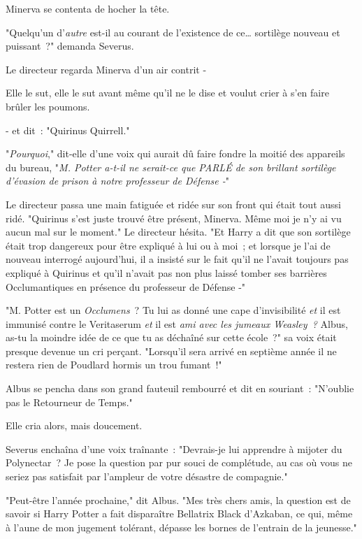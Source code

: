 Minerva se contenta de hocher la tête.

"Quelqu'un d'\emph{autre} est-il au courant de l'existence de ce… sortilège nouveau et puissant~?" demanda Severus.

Le directeur regarda Minerva d'un air contrit -

Elle le sut, elle le sut avant même qu'il ne le dise et voulut crier à s'en faire brûler les poumons.

- et dit~: "Quirinus Quirrell."

"\emph{Pourquoi}," dit-elle d'une voix qui aurait dû faire fondre la moitié des appareils du bureau, "\emph{M. Potter a-t-il ne serait-ce que PARLÉ de son brillant sortilège d'évasion de prison à notre professeur de Défense -}"

Le directeur passa une main fatiguée et ridée sur son front qui était tout aussi ridé. "Quirinus s'est juste trouvé être présent, Minerva. Même moi je n'y ai vu aucun mal sur le moment." Le directeur hésita. "Et Harry a dit que son sortilège était trop dangereux pour être expliqué à lui ou à moi~; et lorsque je l'ai de nouveau interrogé aujourd'hui, il a insisté sur le fait qu'il ne l'avait toujours pas expliqué à Quirinus et qu'il n'avait pas non plus laissé tomber ses barrières Occlumantiques en présence du professeur de Défense -"

"M. Potter est un \emph{Occlumens}~? Tu lui as donné une cape d'invisibilité \emph{et} il est immunisé contre le Veritaserum \emph{et} il est \emph{ami avec les jumeaux Weasley~?} Albus, as-tu la moindre idée de ce que tu as déchaîné sur cette école~?" sa voix était presque devenue un cri perçant. "Lorsqu'il sera arrivé en septième année il ne restera rien de Poudlard hormis un trou fumant~!"

Albus se pencha dans son grand fauteuil rembourré et dit en souriant~: "N'oublie pas le Retourneur de Temps."

Elle cria alors, mais doucement.

Severus enchaîna d'une voix traînante~: "Devrais-je lui apprendre à mijoter du Polynectar~? Je pose la question par pur souci de complétude, au cas où vous ne seriez pas satisfait par l'ampleur de votre désastre de compagnie."

"Peut-être l'année prochaine," dit Albus. "Mes très chers amis, la question est de savoir si Harry Potter a fait disparaître Bellatrix Black d'Azkaban, ce qui, même à l'aune de mon jugement tolérant, dépasse les bornes de l'entrain de la jeunesse."

